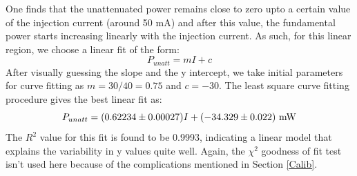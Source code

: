 One finds that the unattenuated power remains close to zero upto a certain value of the injection current (around 50 mA) and after this value, the fundamental power starts increasing linearly with the injection current. As such, for this linear region, we choose a linear fit of the form: 
\begin{equation}
P_{unatt}=mI+c
\end{equation}  
After visually guessing the slope and the y intercept, we take initial parameters for curve fitting as $m=30/40=0.75$ and $c=-30$. The least square curve fitting procedure gives the best linear fit as: 
\begin{equation}
P_{unatt}=(0.62234\pm 0.00027)I+(-34.329\pm 0.022)\ \rm{mW}
\end{equation}
The $R^{2}$ value for this fit is found to be 0.9993, indicating a linear model that explains the variability in y values quite well. Again, the $\chi^{2}$ goodness of fit test isn't used here because of the complications mentioned in Section \ref{Calib}.

